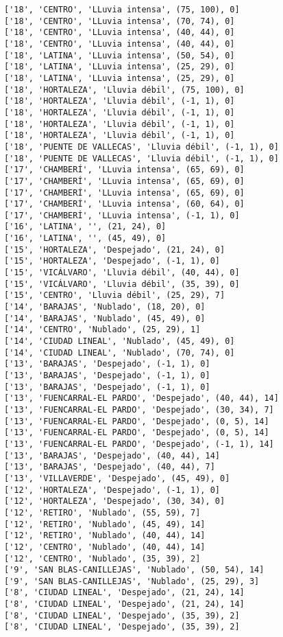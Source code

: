 \documentclass[11pt]{article}
\begin{document}
\begin{Verbatim}[commandchars=\\\{\}]
['18', 'CENTRO', 'LLuvia intensa', (75, 100), 0]
['18', 'CENTRO', 'LLuvia intensa', (70, 74), 0]
['18', 'CENTRO', 'LLuvia intensa', (40, 44), 0]
['18', 'CENTRO', 'LLuvia intensa', (40, 44), 0]
['18', 'LATINA', 'LLuvia intensa', (50, 54), 0]
['18', 'LATINA', 'LLuvia intensa', (25, 29), 0]
['18', 'LATINA', 'LLuvia intensa', (25, 29), 0]
['18', 'HORTALEZA', 'Lluvia débil', (75, 100), 0]
['18', 'HORTALEZA', 'Lluvia débil', (-1, 1), 0]
['18', 'HORTALEZA', 'Lluvia débil', (-1, 1), 0]
['18', 'HORTALEZA', 'Lluvia débil', (-1, 1), 0]
['18', 'HORTALEZA', 'Lluvia débil', (-1, 1), 0]
['18', 'PUENTE DE VALLECAS', 'Lluvia débil', (-1, 1), 0]
['18', 'PUENTE DE VALLECAS', 'Lluvia débil', (-1, 1), 0]
['17', 'CHAMBERÍ', 'LLuvia intensa', (65, 69), 0]
['17', 'CHAMBERÍ', 'LLuvia intensa', (65, 69), 0]
['17', 'CHAMBERÍ', 'LLuvia intensa', (65, 69), 0]
['17', 'CHAMBERÍ', 'LLuvia intensa', (60, 64), 0]
['17', 'CHAMBERÍ', 'LLuvia intensa', (-1, 1), 0]
['16', 'LATINA', '', (21, 24), 0]
['16', 'LATINA', '', (45, 49), 0]
['15', 'HORTALEZA', 'Despejado', (21, 24), 0]
['15', 'HORTALEZA', 'Despejado', (-1, 1), 0]
['15', 'VICÁLVARO', 'Lluvia débil', (40, 44), 0]
['15', 'VICÁLVARO', 'Lluvia débil', (35, 39), 0]
['15', 'CENTRO', 'Lluvia débil', (25, 29), 7]
['14', 'BARAJAS', 'Nublado', (18, 20), 0]
['14', 'BARAJAS', 'Nublado', (45, 49), 0]
['14', 'CENTRO', 'Nublado', (25, 29), 1]
['14', 'CIUDAD LINEAL', 'Nublado', (45, 49), 0]
['14', 'CIUDAD LINEAL', 'Nublado', (70, 74), 0]
['13', 'BARAJAS', 'Despejado', (-1, 1), 0]
['13', 'BARAJAS', 'Despejado', (-1, 1), 0]
['13', 'BARAJAS', 'Despejado', (-1, 1), 0]
['13', 'FUENCARRAL-EL PARDO', 'Despejado', (40, 44), 14]
['13', 'FUENCARRAL-EL PARDO', 'Despejado', (30, 34), 7]
['13', 'FUENCARRAL-EL PARDO', 'Despejado', (0, 5), 14]
['13', 'FUENCARRAL-EL PARDO', 'Despejado', (0, 5), 14]
['13', 'FUENCARRAL-EL PARDO', 'Despejado', (-1, 1), 14]
['13', 'BARAJAS', 'Despejado', (40, 44), 14]
['13', 'BARAJAS', 'Despejado', (40, 44), 7]
['13', 'VILLAVERDE', 'Despejado', (45, 49), 0]
['12', 'HORTALEZA', 'Despejado', (-1, 1), 0]
['12', 'HORTALEZA', 'Despejado', (30, 34), 0]
['12', 'RETIRO', 'Nublado', (55, 59), 7]
['12', 'RETIRO', 'Nublado', (45, 49), 14]
['12', 'RETIRO', 'Nublado', (40, 44), 14]
['12', 'CENTRO', 'Nublado', (40, 44), 14]
['12', 'CENTRO', 'Nublado', (35, 39), 2]
['9', 'SAN BLAS-CANILLEJAS', 'Nublado', (50, 54), 14]
['9', 'SAN BLAS-CANILLEJAS', 'Nublado', (25, 29), 3]
['8', 'CIUDAD LINEAL', 'Despejado', (21, 24), 14]
['8', 'CIUDAD LINEAL', 'Despejado', (21, 24), 14]
['8', 'CIUDAD LINEAL', 'Despejado', (35, 39), 2]
['8', 'CIUDAD LINEAL', 'Despejado', (35, 39), 2]

\end{Verbatim}
\end{document}
